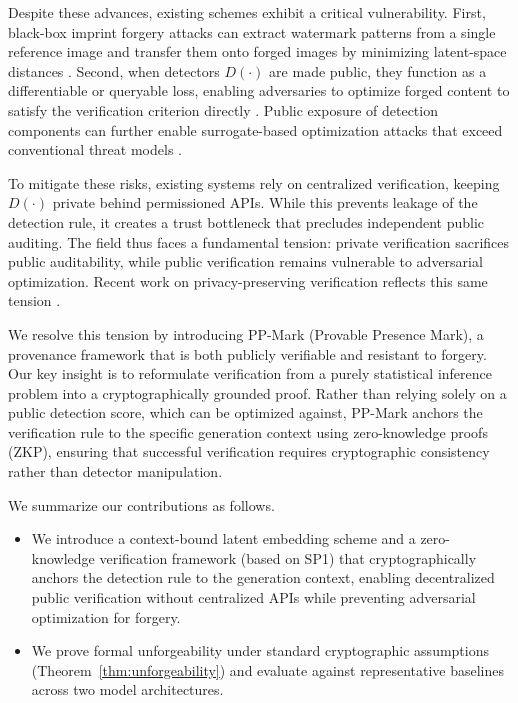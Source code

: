 \documentclass{article}
\theoremstyle{plain}
\theoremstyle{definition}
\theoremstyle{remark}
\begin{document}
Despite these advances, existing schemes exhibit a critical vulnerability. First, black-box imprint forgery attacks can extract watermark patterns from a single reference image and transfer them onto forged images by minimizing latent-space distances \cite{muller2025blackbox}. Second, when detectors $D(\cdot)$ are made public, they function as a differentiable or queryable loss, enabling adversaries to optimize forged content to satisfy the verification criterion directly \cite{jiang2023evading}. Public exposure of detection components can further enable surrogate-based optimization attacks that exceed conventional threat models \cite{lin2025crack}.

To mitigate these risks, existing systems rely on centralized verification, keeping $D(\cdot)$ private behind permissioned APIs. While this prevents leakage of the detection rule, it creates a trust bottleneck that precludes independent public auditing. The field thus faces a fundamental tension: private verification sacrifices public auditability, while public verification remains vulnerable to adversarial optimization. Recent work on privacy-preserving verification reflects this same tension \cite{guo2024zeromark}.

We resolve this tension by introducing PP-Mark (Provable Presence Mark), a provenance framework that is both publicly verifiable and resistant to forgery. Our key insight is to reformulate verification from a purely statistical inference problem into a cryptographically grounded proof. Rather than relying solely on a public detection score, which can be optimized against, PP-Mark anchors the verification rule to the specific generation context using zero-knowledge proofs (ZKP), ensuring that successful verification requires cryptographic consistency rather than detector manipulation.

We summarize our contributions as follows.
\begin{itemize}
    \item We introduce a context-bound latent embedding scheme and a zero-knowledge verification framework (based on SP1) that cryptographically anchors the detection rule to the generation context, enabling decentralized public verification without centralized APIs while preventing adversarial optimization for forgery.
    \item We prove formal unforgeability under standard cryptographic assumptions (Theorem~\ref{thm:unforgeability}) and evaluate against representative baselines across two model architectures.
\end{itemize}
  
\end{document}

